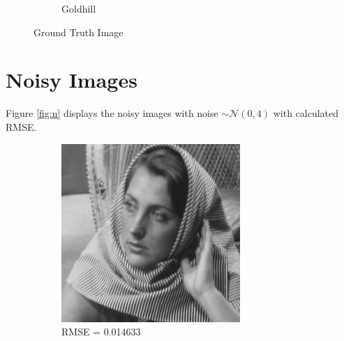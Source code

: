 \documentclass[a4paper]{article}
\begin{document}
\begin{figure}[H]
\begin{subfigure}{0.24\linewidth}
        \caption{Goldhill}
    \end{subfigure}
    \caption{Ground Truth Image}
    \label{fig:gt}
\end{figure}
\section{Noisy Images}
Figure \ref{fig:n} displays the noisy images with noise $\sim\mathcal{N}(0,4)$ with calculated RMSE.
\begin{figure}[H]
    \centering
    \begin{subfigure}{0.24\linewidth}
        \centering
        \includegraphics[width = \linewidth]{barbara256 with noise.png}
        \caption{RMSE = 0.014633}
    \end{subfigure}
    \begin{subfigure}{0.24\linewidth}
        \centering

\end{subfigure}
\end{figure}
\end{document}
